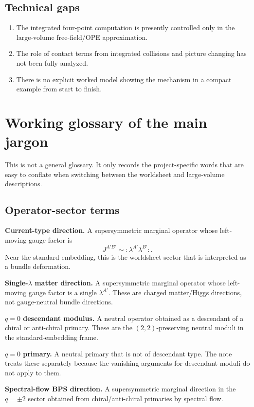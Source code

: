 \documentclass[11pt]{article}
\begin{document}
\subsection*{Technical gaps}

\begin{enumerate}
\item The integrated four-point computation is presently controlled only in the large-volume free-field/OPE approximation.
\item The role of contact terms from integrated collisions and picture changing has not been fully analyzed.
\item There is no explicit worked model showing the mechanism in a compact example from start to finish.
\end{enumerate}

\section{Working glossary of the main jargon}

This is not a general glossary. It only records the project-specific words that are easy to conflate when switching between the worldsheet and large-volume descriptions.

\subsection*{Operator-sector terms}

\textbf{Current-type direction.} A supersymmetric marginal operator whose left-moving gauge factor is
\[
J^{A'B'}\sim :\lambda^{A'}\lambda^{B'}:.
\]
Near the standard embedding, this is the worldsheet sector that is interpreted as a bundle deformation.

\textbf{Single-$\lambda$ matter direction.} A supersymmetric marginal operator whose left-moving gauge factor is a single $\lambda^{A'}$. These are charged matter/Higgs directions, not gauge-neutral bundle directions.

\textbf{$q=0$ descendant modulus.} A neutral operator obtained as a descendant of a chiral or anti-chiral primary. These are the $(2,2)$-preserving neutral moduli in the standard-embedding frame.

\textbf{$q=0$ primary.} A neutral primary that is not of descendant type. The note treats these separately because the vanishing arguments for descendant moduli do not apply to them.

\textbf{Spectral-flow BPS direction.} A supersymmetric marginal direction in the $q=\pm 2$ sector obtained from chiral/anti-chiral primaries by spectral flow.
\end{document}
